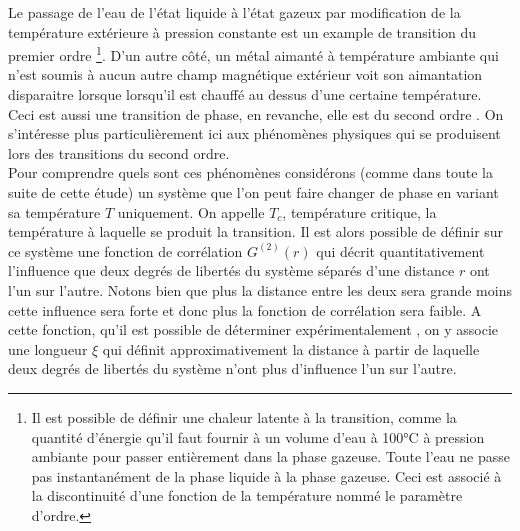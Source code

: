 \documentclass[10pt]{article}
\begin{document}
\begin{multicols}{2}
Le passage de l'eau de l'état liquide à l'état gazeux par modification de la température extérieure à pression constante est un example de transition du premier ordre \footnote{Il est possible de définir une chaleur latente à la transition, comme la quantité d'énergie qu'il faut fournir à un volume d'eau à 100°C à pression ambiante pour passer entièrement dans la phase gazeuse. Toute l'eau ne passe pas instantanément de la phase liquide à la phase gazeuse. Ceci est associé à la discontinuité d'une fonction de la température nommé le paramètre d'ordre.}. 
D'un autre côté, un métal aimanté à température ambiante qui n'est soumis à aucun autre champ magnétique extérieur voit son aimantation disparaitre lorsque lorsqu'il est chauffé au dessus d'une certaine température. Ceci est aussi une transition de phase, en revanche, elle est du second ordre \cite{kochmanski2013curie}. On s'intéresse plus particulièrement ici aux phénomènes physiques qui se produisent lors des transitions du second ordre. \\

Pour comprendre quels sont ces phénomènes considérons (comme dans toute la suite de cette étude) un système que l'on peut faire changer de phase en variant sa température $T$ uniquement. On appelle $T_c$, température critique, la température à laquelle se produit la transition. Il est alors possible de définir sur ce système une fonction de corrélation $G^{(2)}(r)$ qui décrit quantitativement l'influence que deux degrés de libertés du système séparés d'une distance $r$ ont l'un sur l'autre. Notons bien que plus la distance entre les deux sera grande moins cette influence sera forte et donc plus la fonction de corrélation sera faible. A cette fonction, qu'il est possible de déterminer expérimentalement \cite{Bellac2012}, on y associe une longueur $\xi$ qui définit approximativement la distance à partir de laquelle deux degrés de libertés du système n'ont plus d'influence l'un sur l'autre.\\


\end{multicols}
\end{document}
